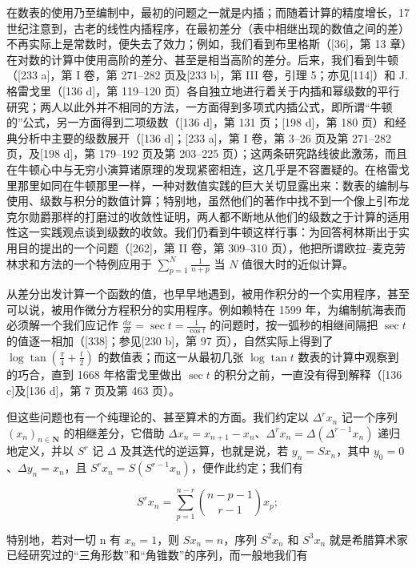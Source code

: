 在数表的使用乃至编制中，最初的问题之一就是内插；而随着计算的精度增长，17 世纪注意到，古老的线性内插程序，在最初差分（表中相继出现的数值之间的差）不再实际上是常数时，便失去了效力；例如，我们看到布里格斯（{[}36{]}，第 13 章）在对数的计算中使用高阶的差分、甚至是相当高阶的差分。后来，我们看到牛顿（{[}233 a{]}，第 I 卷，第 271–282 页及{[}233 b{]}，第 III 卷，引理 5；亦见{[}114{]}）和 J. 格雷戈里（{[}136 d{]}，第 119–120 页）各自独立地进行着关于内插和幂级数的平行研究；两人以此外并不相同的方法，一方面得到多项式内插公式，即所谓“牛顿的”公式，另一方面得到二项级数（{[}136 d{]}，第 131 页；{[}198 d{]}，第 180 页）和经典分析中主要的级数展开（{[}136 d{]}；{[}233 a{]}，第 I 卷，第 3–26 页及第 271–282 页，及{[}198 d{]}，第 179–192 页及第 203–225 页）；这两条研究路线彼此激荡，而且在牛顿心中与无穷小演算诸原理的发现紧密相连，这几乎是不容置疑的。在格雷戈里那里如同在牛顿那里一样，一种对数值实践的巨大关切显露出来：数表的编制与使用、级数与积分的数值计算；特别地，虽然他们的著作中找不到一个像上引布龙克尔勋爵那样的打磨过的收敛性证明，两人都不断地从他们的级数之于计算的适用性这一实践观点谈到级数的收敛。我们仍看到牛顿这样行事：为回答柯林斯出于实用目的提出的一个问题（{[}262{]}，第 II 卷，第 309–310 页），他把所谓欧拉–麦克劳林求和方法的一个特例应用于 \(\sum_{p=1}^{N} \frac{1}{n+p}\) 当 \(N\) 值很大时的近似计算。

从差分出发计算一个函数的值，也早早地遇到，被用作积分的一个实用程序，甚至可以说，被用作微分方程积分的实用程序。例如赖特在 1599 年，为编制航海表而必须解一个我们应记作 \(\frac{dx}{dt} = \sec t = \frac{1}{\cos t}\) 的问题时，按一弧秒的相继间隔把 \(\sec t\) 的值逐一相加（{[}338{]}；参见{[}230 b{]}，第 97 页），自然实际上得到了 \(\log \tan (\frac{\pi}{4} + \frac{t}{2})\) 的数值表；而这一从最初几张 \(\log \tan t\) 数表的计算中观察到的巧合，直到 1668 年格雷戈里做出 \(\sec t\) 的积分之前，一直没有得到解释（{[}136 c{]}及{[}136 d{]}，第 7 页及第 463 页）。

但这些问题也有一个纯理论的、甚至算术的方面。我们约定以 \(\Delta^r x_n\) 记一个序列 \((x_n)_{n\in \mathbf{N}}\) 的相继差分，它借助 \(\Delta x_{n} = x_{n + 1} - x_{n}\)、\(\Delta^r x_n = \Delta (\Delta^{r - 1}x_n)\) 递归地定义，并以 \(S^r\) 记 \(\Delta\) 及其迭代的逆运算，也就是说，若 \(y_{n} = Sx_{n}\)，其中 \(y_0 = 0\)、\(\Delta y_{n} = x_{n}\)，且 \(S^r x_n = S(S^{r - 1}x_n)\)，便作此约定；我们有

\[
S ^ {r} x _ {n} = \sum_ {p = 1} ^ {n - r} \binom{n - p - 1}{r - 1} x _ {p};
\]

特别地，若对一切 n 有 \(x_{n}=1\)，则 \(Sx_{n}=n\)，序列 \(S^{2}x_{n}\) 和 \(S^{3}x_{n}\) 就是希腊算术家已经研究过的“三角形数”和“角锥数”的序列，而一般地我们有

